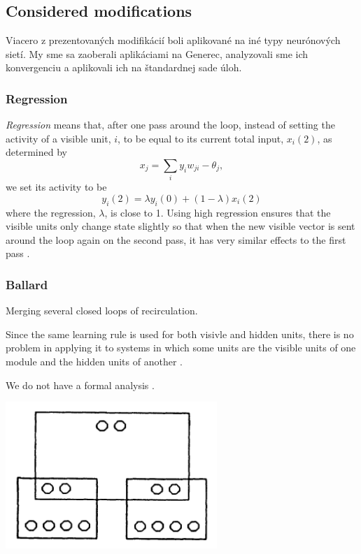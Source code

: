 \subsection{Considered modifications}
Viacero z prezentovaných modifikácií boli aplikované na iné typy neurónových sietí. My sme sa zaoberali aplikáciami na Generec, analyzovali sme ich konvergenciu a aplikovali ich na štandardnej sade úloh. 

\subsubsection{Regression} 

\textit{Regression} means that, after one pass around the loop, instead of setting the activity of a visible unit, $i$, to be equal to its current total input, $x_i(2)$, as determined by 
$$x_j = \sum_i y_iw_{ji} - \theta_j,$$
we set its activity to be 
$$y_i(2) = \lambda y_i(0) + (1-\lambda)x_i(2)$$
where the regression, $\lambda$, is close to 1. Using high regression ensures that the visible units only change state slightly so that when the new visible vector is sent around the loop again on the second pass, it has very similar effects to the first pass \cite{hinton1988learning}.

\subsubsection{Ballard}
Merging several closed loops of recirculation. 

Since the same learning rule is used for both visivle and hidden units, there is no problem in applying it to systems in which some units are the visible units of one module and the hidden units of another \cite{hinton1988learning}. 

We do not have a formal analysis \cite{hinton1988learning}.

\includegraphics[width=8cm]{img/ballard.png}

